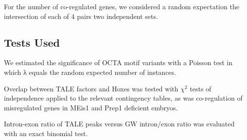 For the number of co-regulated genes, we considered a random expectation the intersection of each of 4 pairs two independent sets. 

\subsection{Tests Used}

We estimated the significance of OCTA motif variants with a Poisson test in which λ equals the random expected number of instances.

Overlap between \ac{TALE} factors and Hoxes was tested with $\chi^2$ tests of independence applied to the relevant contingency tables, as was co-regulation of misregulated genes in MEis1 and Prep1 deficient embryos.

Intron-exon ratio of \ac{TALE} peaks versus \ac{GW} intron/exon ratio was evaluated with an exact binomial test.
